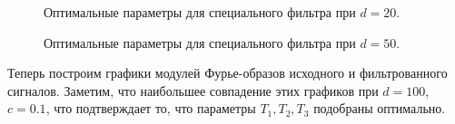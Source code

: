 \documentclass[a5paper, 10pt]{article}
\theoremstyle{definition}
\theoremstyle{plain}
\theoremstyle{remark}
\begin{document}
\begin{figure}[h!]
\caption{Оптимальные параметры для специального фильтра при $d=20$.}
\caption{Оптимальные параметры для специального фильтра при $d=50$.}
\end{figure}

\newpage
Теперь построим графики модулей Фурье-образов исходного и фильтрованного сигналов. Заметим, что наибольшее совпадение этих графиков при $d=100$, $c=0.1$, что подтверждает то, что параметры $T_1, T_2, T_3$ подобраны оптимально.
\end{document}
